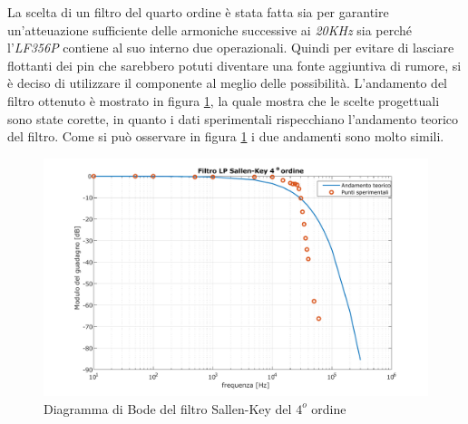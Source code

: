 \documentclass[titlepage]{report}
\begin{document}
	La scelta di un filtro del quarto ordine è stata fatta sia per garantire un'atteuazione sufficiente delle armoniche successive ai \textit{20KHz} sia perché l'\textit{LF356P} contiene al suo interno due operazionali. Quindi per evitare di lasciare flottanti dei pin che sarebbero potuti diventare una fonte aggiuntiva di rumore, si è deciso di utilizzare il componente al meglio delle possibilità.
	L'andamento del filtro ottenuto è mostrato in figura \ref{fig:BODELp4Real}, la quale mostra che le scelte progettuali sono state corette, in quanto i dati sperimentali rispecchiano l'andamento teorico del filtro.
	Come si può osservare in figura \ref{fig:BODELp4Real} i due andamenti sono molto simili.
	
	\begin{figure}[h]
		\centering
		\includegraphics[scale=0.7]{Immagini/bode_lp4.pdf}
		\caption{Diagramma di Bode del filtro Sallen-Key del $4^o$ ordine}
		\label{fig:BODELp4Real}
	\end{figure}
	
	
	     

		
     	
\end{document}
